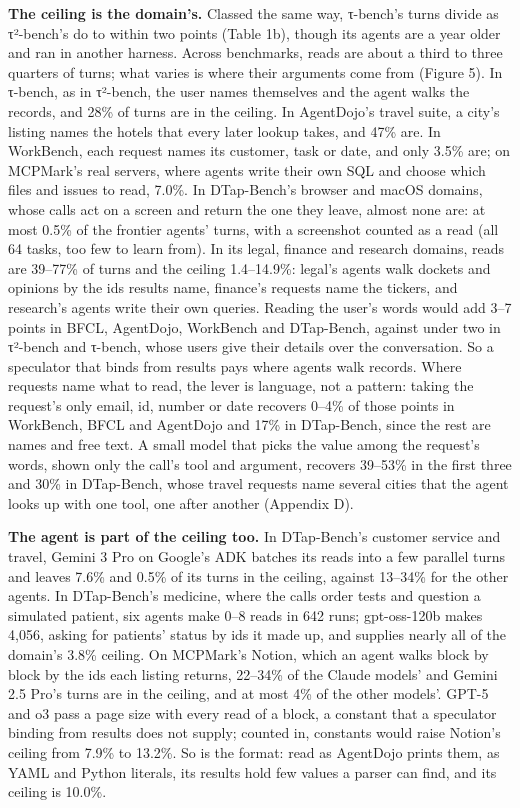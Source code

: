 \documentclass[10pt,twocolumn,letterpaper]{article}
\newcommand{\runin}[1]{{\sffamily\bfseries\color{accent}#1}}
\begin{document}
\runin{The ceiling is the domain's.} Classed the same way, τ-bench's turns divide as τ²-bench's do to within two points (Table 1b), though its agents are a year older and ran in another harness. Across benchmarks, reads are about a third to three quarters of turns; what varies is where their arguments come from (Figure 5). In τ-bench, as in τ²-bench, the user names themselves and the agent walks the records, and 28\% of turns are in the ceiling. In AgentDojo's travel suite, a city's listing names the hotels that every later lookup takes, and 47\% are. In WorkBench, each request names its customer, task or date, and only 3.5\% are; on MCPMark's real servers, where agents write their own SQL and choose which files and issues to read, 7.0\%. In DTap-Bench's browser and macOS domains, whose calls act on a screen and return the one they leave, almost none are: at most 0.5\% of the frontier agents' turns, with a screenshot counted as a read (all 64 tasks, too few to learn from). In its legal, finance and research domains, reads are 39--77\% of turns and the ceiling 1.4--14.9\%: legal's agents walk dockets and opinions by the ids results name, finance's requests name the tickers, and research's agents write their own queries. Reading the user's words would add 3--7 points in BFCL, AgentDojo, WorkBench and DTap-Bench, against under two in τ²-bench and τ-bench, whose users give their details over the conversation. So a speculator that binds from results pays where agents walk records. Where requests name what to read, the lever is language, not a pattern: taking the request's only email, id, number or date recovers 0--4\% of those points in WorkBench, BFCL and AgentDojo and 17\% in DTap-Bench, since the rest are names and free text. A small model that picks the value among the request's words, shown only the call's tool and argument, recovers 39--53\% in the first three and 30\% in DTap-Bench, whose travel requests name several cities that the agent looks up with one tool, one after another (Appendix D).

\runin{The agent is part of the ceiling too.} In DTap-Bench's customer service and travel, Gemini 3 Pro on Google's ADK batches its reads into a few parallel turns and leaves 7.6\% and 0.5\% of its turns in the ceiling, against 13--34\% for the other agents. In DTap-Bench's medicine, where the calls order tests and question a simulated patient, six agents make 0--8 reads in 642 runs; gpt-oss-120b makes 4,056, asking for patients' status by ids it made up, and supplies nearly all of the domain's 3.8\% ceiling. On MCPMark's Notion, which an agent walks block by block by the ids each listing returns, 22--34\% of the Claude models' and Gemini 2.5 Pro's turns are in the ceiling, and at most 4\% of the other models'. GPT-5 and o3 pass a page size with every read of a block, a constant that a speculator binding from results does not supply; counted in, constants would raise Notion's ceiling from 7.9\% to 13.2\%. So is the format: read as AgentDojo prints them, as YAML and Python literals, its results hold few values a parser can find, and its ceiling is 10.0\%.
\end{document}
